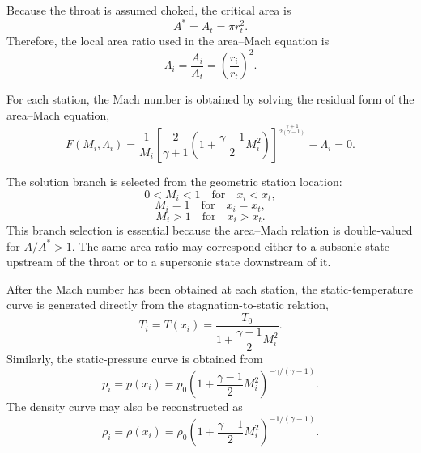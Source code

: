 \documentclass[11pt,a4paper]{article}
\begin{document}
Because the throat is assumed choked, the critical area is
\begin{equation}
A^*=A_t=\pi r_t^2.
\end{equation}
Therefore, the local area ratio used in the area--Mach equation is
\begin{equation}
\Lambda_i=\frac{A_i}{A_t}=\left(\frac{r_i}{r_t}\right)^2.
\label{eq:local_area_ratio_discrete}
\end{equation}

For each station, the Mach number is obtained by solving the residual form of the area--Mach equation,
\begin{equation}
F(M_i,\Lambda_i)=
\frac{1}{M_i}
\left[
\frac{2}{\gamma+1}
\left(1+\frac{\gamma-1}{2}M_i^2\right)
\right]^{\frac{\gamma+1}{2(\gamma-1)}}
-\Lambda_i=0.
\label{eq:mach_curve_residual}
\end{equation}

The solution branch is selected from the geometric station location:
\begin{equation}
0<M_i<1 \quad \text{for} \quad x_i<x_t,
\end{equation}
\begin{equation}
M_i=1 \quad \text{for} \quad x_i=x_t,
\end{equation}
\begin{equation}
M_i>1 \quad \text{for} \quad x_i>x_t.
\end{equation}
This branch selection is essential because the area--Mach relation is double-valued for \(A/A^*>1\). The same area ratio may correspond either to a subsonic state upstream of the throat or to a supersonic state downstream of it.

After the Mach number has been obtained at each station, the static-temperature curve is generated directly from the stagnation-to-static relation,
\begin{equation}
T_i=T(x_i)=\frac{T_0}{1+\dfrac{\gamma-1}{2}M_i^2}.
\label{eq:temperature_curve}
\end{equation}
Similarly, the static-pressure curve is obtained from
\begin{equation}
p_i=p(x_i)=p_0
\left(1+\frac{\gamma-1}{2}M_i^2\right)^{-\gamma/(\gamma-1)}.
\label{eq:pressure_curve}
\end{equation}
The density curve may also be reconstructed as
\begin{equation}
\rho_i=\rho(x_i)=\rho_0
\left(1+\frac{\gamma-1}{2}M_i^2\right)^{-1/(\gamma-1)}.
\label{eq:density_curve}
\end{equation}
\end{document}
